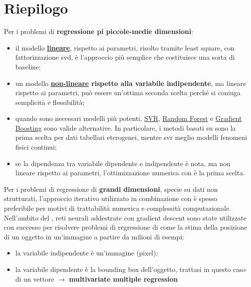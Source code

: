 \section{Riepilogo}\label{sec:riepilogo} %
Per i problemi di \textbf{regressione pi piccole-medie dimensioni}:
\begin{itemize}
    \item il modello \textbf{\hyperref[sec:lineare]{lineare}}, rispetto ai parametri, risolto tramite least square, con fattorizzazione \ac{svd}, è l'approccio più semplice che costituisce una sorta di baseline;
    \item un modello \textbf{\hyperref[sec:non_lineare]{non-lineare} rispetto alla variabile indipendente}, ma lineare rispetto ai parametri, può essere un'ottima seconda scelta perché si coniuga semplicità e flessibilità;
    \item quando sono necessari modelli più potenti, \hyperref[sub:svr]{SVR}, \hyperref[sub:random_forest_regressor]{Random Forest} e \hyperref[sub:gradient_boosting_regressor_trees]{Gradient Boosting} sono valide alternative.
        In particolare, i metodi basati su  sono la prima scelta per dati tabellari eterogenei, mentre \ac{svr} meglio modelli fenomeni fisici continui;
    \item se la dipendenza tra variabile dipendente e indipendente è nota, ma non lineare rispetto ai parametri, l'ottimizzazione numerica con  è la prima scelta.
\end{itemize}
Per i problemi di regressione di \textbf{grandi dimensioni}, specie su dati non strutturati, l'approccio iterativo  utilizzato in combinazione con  è spesso preferibile per motivi di trattabilità numerica e complessità computazionale.
\emptyln{}
Nell'ambito del , reti neurali addestrate con gradient descent sono state utilizzate con successo per risolvere problemi di regressione di  come la stima della posizione di un oggetto in un'immagine a partire da milioni di esempi:
\begin{itemize}
    \item la variabile indipendente è un'immagine (pixel);
    \item la variabile dipendente è la bounding box dell'oggetto, trattasi in questo caso di un vettore $\longrightarrow$ \textbf{multivariate multiple regression}
\end{itemize}

